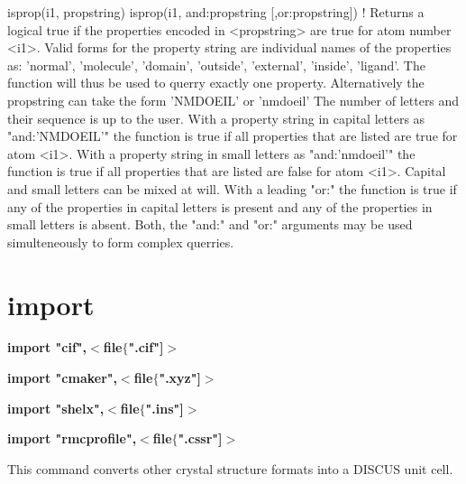 \begin{MacVerbatim}
isprop(i1, propstring)
isprop(i1, and:propstring [,or:propstring])
                                ! Returns a logical true if the properties
                                  encoded in <propstring> are true for
                                  atom number <i1>.
                                  Valid forms for the property string are
                                  individual names of the properties as:
                                  'normal', 'molecule', 'domain',
                                  'outside', 'external', 'inside',
                                  'ligand'.
                                  The function will thus be used to querry
                                  exactly one property.
                                  Alternatively the propstring can take
                                  the form 'NMDOEIL' or 'nmdoeil'
                                  The number of letters and their sequence
                                  is up to the user.
                                  With a property string in capital
                                  letters as "and:'NMDOEIL'" the function
                                  is true if all properties that are
                                  listed are true for atom <i1>.
                                  With a property string in small
                                  letters as "and:'nmdoeil'" the function
                                  is true if all properties that are
                                  listed are false for atom <i1>.
                                  Capital and small letters can be
                                  mixed at will.
                                  With a leading "or:" the function is
                                  true if any of the properties in
                                  capital letters is present and any
                                  of the properties in small letters is
                                  absent.
                                  Both, the "and:" and "or:" arguments
                                  may be used simulteneously to form
                                  complex querries.

\end{MacVerbatim}
\section{import}
{\bf import "cif",$ <$file$ \{$".cif"]$> $ \par }
{\bf import "cmaker",$ <$file$ \{$".xyz"]$> $ \par }
{\bf import "shelx",$ <$file$ \{$".ins"]$> $ \par }
{\bf import "rmcprofile",$ <$file$ \{$".cssr"]$> $ \par }
\par
\vspace{3pt}
This command converts other crystal structure formats into a DISCUS 
unit cell. 
\par
